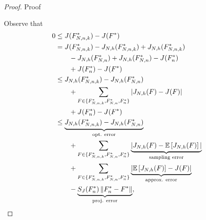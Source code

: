 \documentclass[11pt,leqno]{amsart}
\begin{document}
\begin{proof}{Proof} %

Observe that  
\begin{equation}
\begin{aligned} \label{fintimebd} 
0 &\leq J(F^*_{N,n,k}) - J(F^*) %
\\ & = J(F^*_{N,n,k}) - J_{N,h}(F^*_{N,n,k}) + J_{N,h}(F^*_{N,n,k})\\
&\qquad- J_{N,h}(F^*_{N,n}) + J_{N,h}(F^*_{N,n}) - J(F_{n}^*)\\
&\qquad+ J(F_{n}^*) - J(F^*) \\ 
& \leq
J_{N,h}(F^*_{N,n,k}) - J_{N,h}(F^*_{N,n}) \\
&\qquad +\sum_{F \in \{F^*_{N,n,k}, F^*_{N,n}, F_{n}^*\}} |J_{N,h}(F) - J(F)|\\
&\qquad + J(F_{n}^*) - J(F^*) \\ 
& \leq
\underbrace{J_{N,h}(F^*_{N,n,k}) - J_{N,h}(F^*_{N,n})}_{\mbox{\scriptsize opt. error}}\\
&\qquad+ \sum_{F \in \{F^*_{N,n,k}, F^*_{N,n}, F_{n}^*\}} \underbrace{|J_{N,h}(F) - \mathbb{E}\left[J_{N,h}(F)\right]|}_{\mbox{\scriptsize sampling error}}   \\
&\qquad+ \sum_{F \in \{F^*_{N,n,k}, F^*_{N,n}, F_{n}^*\}} \underbrace{|\mathbb{E}\left[J_{N,h}(F)\right] - J(F)|}_{\mbox{\scriptsize approx. error}}\\
&\qquad-\underbrace{S_J(F^*_{n}) \, \|F_{n}^* - F^*\|}_{\mbox{\scriptsize proj. error}},
\end{aligned}    
\end{equation}


\end{proof}
\end{document}
